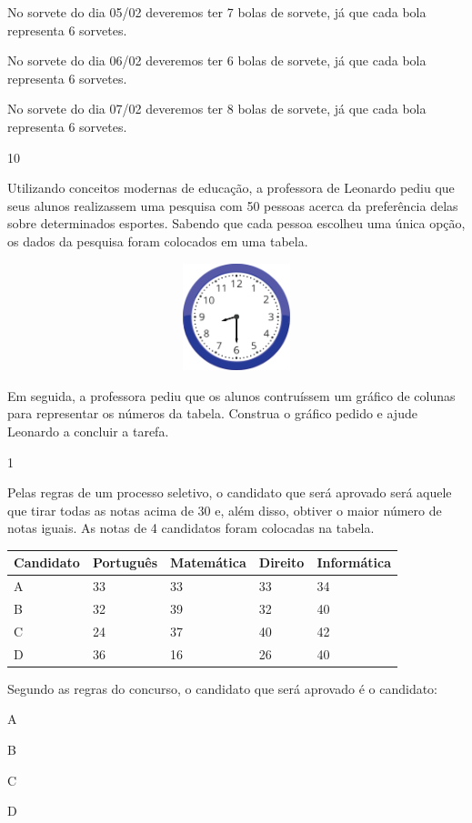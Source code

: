 {\begin{escolha}
{{No sorvete do dia 05/02 deveremos ter 7 bolas de sorvete, já que cada
bola representa 6 sorvetes.

No sorvete do dia 06/02 deveremos ter 6 bolas de sorvete, já que cada
bola representa 6 sorvetes.

No sorvete do dia 07/02 deveremos ter 8 bolas de sorvete, já que cada
bola representa 6 sorvetes.}

\num{10}

Utilizando conceitos modernas de educação, a professora de Leonardo
pediu que seus alunos realizassem uma pesquisa com 50 pessoas acerca da
preferência delas sobre determinados esportes. Sabendo que cada pessoa
escolheu uma única opção, os dados da pesquisa foram colocados em uma tabela.


\includegraphics[width=5.39213in,height=1.22511in]{media/image100.png}

Em seguida, a professora pediu que os alunos contruíssem um gráfico de
colunas para representar os números da tabela. Construa o gráfico pedido
e ajude Leonardo a concluir a tarefa.



\num{1}

Pelas regras de um processo seletivo, o candidato que será aprovado será
aquele que tirar todas as notas acima de 30 e, além disso, obtiver o maior
número de notas iguais. As notas de 4 candidatos foram colocadas na
tabela.

\begin{longtable}[]{@{}lllll@{}}
\toprule
Candidato & Português & Matemática & Direito &
Informática\tabularnewline
\midrule
\endhead
A & 33 & 33 & 33 & 34\tabularnewline
B & 32 & 39 & 32 & 40\tabularnewline
C & 24 & 37 & 40 & 42\tabularnewline
D & 36 & 16 & 26 & 40\tabularnewline
\bottomrule
\end{longtable}

Segundo as regras do concurso, o candidato que será aprovado é o
candidato:

\begin{escolha}
\item
  A
\item
  B
\item
  C
\item
  D
\end{escolha}

}
\end{escolha}}
